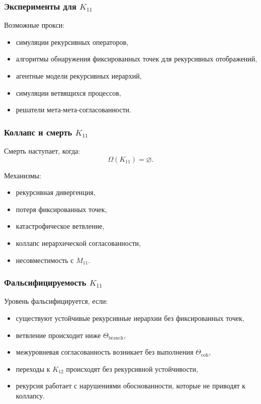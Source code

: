 \subsubsection{Эксперименты для $K_{11}$}

Возможные прокси:
\begin{itemize}
    \item симуляции рекурсивных операторов,
    \item алгоритмы обнаружения фиксированных точек для рекурсивных отображений,
    \item агентные модели рекурсивных иерархий,
    \item симуляции ветвящихся процессов,
    \item решатели мета-мета-согласованности.
\end{itemize}

\subsubsection{Коллапс и смерть $K_{11}$}

Смерть наступает, когда:
\[
\Omega(K_{11})=\varnothing.
\]

Механизмы:
\begin{itemize}
    \item рекурсивная дивергенция,
    \item потеря фиксированных точек,
    \item катастрофическое ветвление,
    \item коллапс иерархической согласованности,
    \item несовместимость с $M_{11}$.
\end{itemize}

\subsubsection{Фальсифицируемость $K_{11}$}

Уровень фальсифицируется, если:
\begin{itemize}
    \item существуют устойчивые рекурсивные иерархии без фиксированных точек,
    \item ветвление происходит ниже $\Theta_{\mathrm{branch}}$,
    \item межуровневая согласованность возникает без выполнения $\Theta_{\mathrm{coh}}$,
    \item переходы к $K_{12}$ происходят без рекурсивной устойчивости,
    \item рекурсия работает с нарушениями обоснованности, которые не приводят к коллапсу.
\end{itemize}

